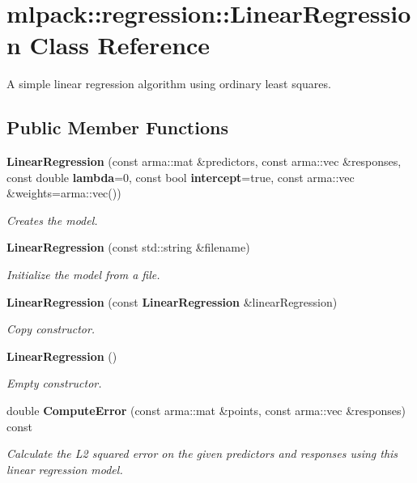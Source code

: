\section{mlpack\-:\-:regression\-:\-:Linear\-Regression Class Reference}
\label{classmlpack_1_1regression_1_1LinearRegression}


A simple linear regression algorithm using ordinary least squares.  


\subsection*{Public Member Functions}
\begin{DoxyCompactItemize}
\item 
{\bf Linear\-Regression} (const arma\-::mat \&predictors, const arma\-::vec \&responses, const double {\bf lambda}=0, const bool {\bf intercept}=true, const arma\-::vec \&weights=arma\-::vec())
\begin{DoxyCompactList}\small\item\em Creates the model. \end{DoxyCompactList}\item 
{\bf Linear\-Regression} (const std\-::string \&filename)
\begin{DoxyCompactList}\small\item\em Initialize the model from a file. \end{DoxyCompactList}\item 
{\bf Linear\-Regression} (const {\bf Linear\-Regression} \&linear\-Regression)
\begin{DoxyCompactList}\small\item\em Copy constructor. \end{DoxyCompactList}\item 
{\bf Linear\-Regression} ()
\begin{DoxyCompactList}\small\item\em Empty constructor. \end{DoxyCompactList}\item 
double {\bf Compute\-Error} (const arma\-::mat \&points, const arma\-::vec \&responses) const 
\begin{DoxyCompactList}\small\item\em Calculate the L2 squared error on the given predictors and responses using this linear regression model. \end{DoxyCompactList}\item 

\end{DoxyCompactItemize}
